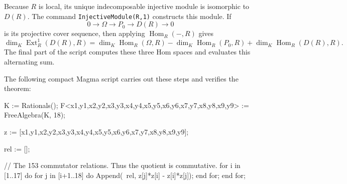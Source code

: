 \documentclass[a4paper]{amsart}
\theoremstyle{definition}
\theoremstyle{remark}
\numberwithin{equation}{section}
\newcommand{\Ext}{\operatorname{Ext}}
\newcommand{\Hom}{\operatorname{Hom}}
\begin{document}
Because $R$ is local, its unique indecomposable injective module is isomorphic to $D(R)$.  The command \texttt{InjectiveModule(R,1)} constructs this module.  If
\[
 0\longrightarrow\Omega\longrightarrow P_0\longrightarrow D(R)\longrightarrow0
\]
is its projective cover sequence, then applying $\Hom_R(-,R)$ gives
\[
 \dim_K\Ext_R^1(D(R),R)
 =\dim_K\Hom_R(\Omega,R)-\dim_K\Hom_R(P_0,R)
  +\dim_K\Hom_R(D(R),R).
\]
The final part of the script computes these three Hom spaces and evaluates this alternating sum.

The following compact Magma script carries out these steps and verifies the theorem:
\begin{MagmaCode}
K := Rationals();
F<x1,y1,x2,y2,x3,y3,x4,y4,x5,y5,x6,y6,x7,y7,x8,y8,x9,y9> := FreeAlgebra(K, 18);

z := [x1,y1,x2,y2,x3,y3,x4,y4,x5,y5,x6,y6,x7,y7,x8,y8,x9,y9];

rel := [];

// The 153 commutator relations.  Thus the quotient is commutative.
for i in [1..17] do
    for j in [i+1..18] do Append(~rel, z[j]*z[i] - z[i]*z[j]); end for;
end for;


\end{MagmaCode}
\end{document}
